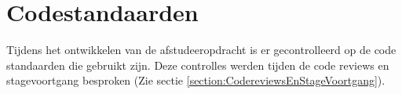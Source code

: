 \section{Codestandaarden}
Tijdens het ontwikkelen van de afstudeeropdracht is er gecontrolleerd op de code standaarden die gebruikt zijn.
Deze controlles werden tijden de code reviews en stagevoortgang besproken (Zie sectie \ref{section:CodereviewsEnStageVoortgang}).
